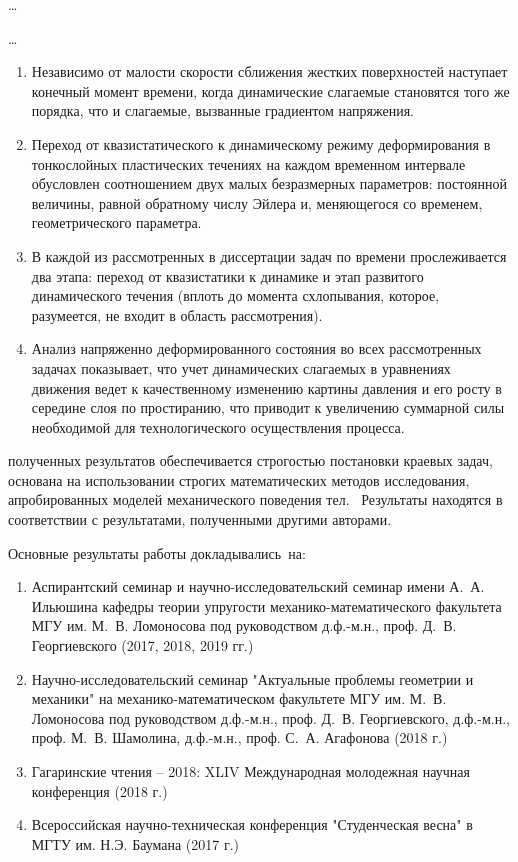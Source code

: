 {\influence} \ldots

{\methods} \ldots

{}
\begin{enumerate}[beginpenalty=10000] %
    \item Независимо от малости скорости сближения жестких поверхностей наступает конечный момент времени, когда динамические слагаемые становятся того же порядка, что и слагаемые, вызванные градиентом напряжения.
    \item Переход от квазистатического к динамическому режиму деформирования в тонкослойных пластических течениях на каждом временном интервале обусловлен соотношением двух малых безразмерных параметров: постоянной величины, равной обратному числу Эйлера и, меняющегося со временем, геометрического параметра.
    \item В каждой из рассмотренных в диссертации задач по времени прослеживается два этапа: переход от квазистатики к динамике и этап развитого динамического течения (вплоть до момента схлопывания, которое, разумеется, не входит в область рассмотрения).
    \item Анализ напряженно деформированного состояния во всех рассмотренных задачах показывает, что учет динамических слагаемых в уравнениях движения ведет к качественному изменению картины давления и его росту в середине слоя по простиранию, что приводит к увеличению суммарной силы необходимой для технологического осуществления процесса.
\end{enumerate}

{\reliability} полученных результатов обеспечивается строгостью постановки краевых задач, основана на использовании строгих математических методов исследования, апробированных моделей механического поведения тел. \ Результаты находятся в соответствии с результатами, полученными другими авторами.


{\probation}
Основные результаты работы докладывались~на:
\begin{enumerate}[beginpenalty=10000] %
    \item Аспирантский семинар и научно-исследовательский семинар имени А.~А. Ильюшина кафедры теории упругости механико-математического факультета МГУ им. М.~В. Ломоносова под руководством д.ф.-м.н., проф. Д.~В. Георгиевского (2017, 2018, 2019 гг.)
    \item Научно-исследовательский семинар "Актуальные проблемы геометрии и механики" на механико-математическом факультете МГУ им. М.~В. Ломоносова под руководством д.ф.-м.н., проф. Д.~В. Георгиевского, д.ф.-м.н., проф. М.~В. Шамолина, д.ф.-м.н., проф. С.~А. Агафонова (2018 г.)
    \item Гагаринские чтения -- 2018: XLIV Международная молодежная научная конференция (2018 г.)
    \item Всероссийская научно-техническая конференция "Студенческая весна" в МГТУ им. Н.Э. Баумана (2017 г.)
\end{enumerate}

